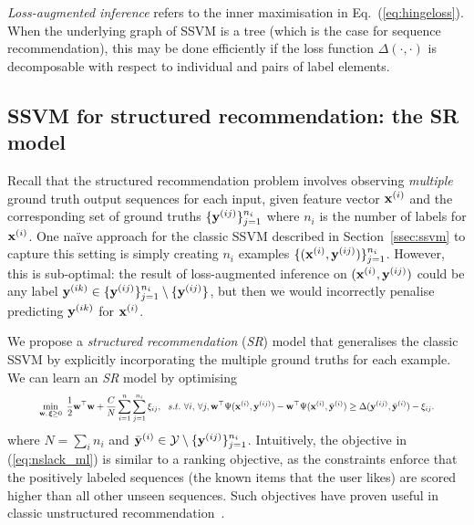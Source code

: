 \emph{Loss-augmented inference} refers to the inner maximisation in Eq.~(\ref{eq:hingeloss}).
When the underlying graph of SSVM is a tree (which is the case for sequence recommendation),
this may be done efficiently if the loss function $\Delta(\cdot,\cdot)$ is decomposable
with respect to individual and pairs of label elements.

\secmoveup
\subsection{SSVM for structured recommendation: the SR model}
\label{ssec:sr}
\textmoveup

Recall that the structured recommendation problem
involves observing \emph{multiple} ground truth output sequences for each input, \ie
given feature vector $\mathbf{x}^{(i)}$ and the corresponding set of ground truths $\{\mathbf{y}^{(ij)}\}_{j=1}^{n_i}$
where $n_i$ is the number of labels for $\mathbf{x}^{(i)}$.
One na\"{i}ve approach for the classic SSVM described in Section~\ref{ssec:ssvm} to capture this setting is simply creating 
$n_i$ examples $\{(\mathbf{x}^{(i)}, \mathbf{y}^{(ij)})\}_{j=1}^{n_i}$. 
However, this is sub-optimal:
the result of loss-augmented inference on $(\mathbf{x}^{(i)}, \mathbf{y}^{(ij)})$ could be any label $\mathbf{y}^{(ik)} \in \{\mathbf{y}^{(ij)}\}_{j=1}^{n_i} \setminus \{\mathbf{y}^{(ij)}\}$,
but then we would incorrectly penalise predicting $\mathbf{y}^{(ik)}$ for $\mathbf{x}^{(i)}$. 

We propose a \emph{structured recommendation} (\emph{SR}) model that generalises the classic SSVM by explicitly incorporating the multiple ground truths for each example.
We can learn an \emph{SR} model by optimising %
\begin{equation}
\label{eq:nslack_ml}
\resizebox{0.9\linewidth}{!}{$
\begin{aligned}
\min_{\w, \, \bm{\xi} \ge 0} ~ \frac{1}{2} \w^\top \w + \frac{C}{N} \sum_{i=1}^n \sum_{j=1}^{n_i} \xi_{ij}, ~~s.t.~ \forall i, \, \forall j, 
  \w^\top \Psi(\x^{(i)}, \y^{(ij)}) - \w^\top \Psi(\x^{(i)}, \bar{\y}^{(i)}) \ge
  \Delta(\y^{(ij)}, \bar{\y}^{(i)}) - \xi_{ij}.
\end{aligned}
$}
\end{equation}
where $N = \sum_i n_i$ and $\bar{\mathbf{y}}^{(i)} \in \mathcal{Y} \setminus \{\mathbf{y}^{(ij)}\}_{j=1}^{n_i}$.
Intuitively, the objective in (\ref{eq:nslack_ml}) is similar to a ranking objective, as the constraints enforce
that the positively labeled sequences (the known items that the user likes) are scored
higher than all other unseen sequences.
Such objectives have proven useful in classic unstructured recommendation~\cite{bpr09}.


